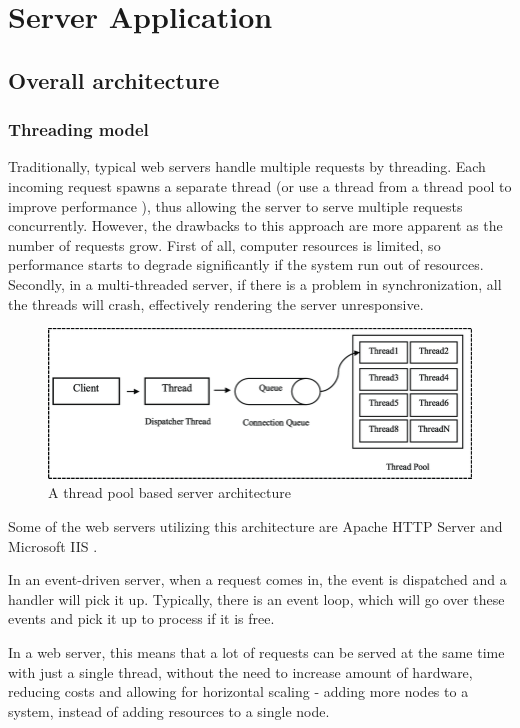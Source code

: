 \section{Server Application}
\subsection{Overall architecture}
\subsubsection{Threading model}
Traditionally, typical web servers handle multiple requests by threading. Each incoming request spawns a separate thread (or use a thread from a thread pool to improve performance \cite{thread_pool}), thus allowing the server to serve multiple requests concurrently. However, the drawbacks to this approach are more apparent as the number of requests grow. First of all, computer resources is limited, so performance starts to degrade significantly if the system run out of resources. Secondly, in a multi-threaded server, if there is a problem in synchronization, all the threads will crash, effectively rendering the server unresponsive.

\begin{figure}[!h]
	\centering
	\includegraphics[scale=0.4]{Picture/server/multithreaded-server-architecture.png}
	\caption{A thread pool based server architecture}
\label{fig:multithreaded-server}
\end{figure}

Some of the web servers utilizing this architecture are Apache HTTP Server \cite{apache} and Microsoft IIS \cite{iis}.

In an event-driven server, when a request comes in, the event is dispatched and a handler will pick it up. Typically, there is an event loop, which will go over these events and pick it up to process if it is free.

In a web server, this means that a lot of requests can be served at the same time with just a single thread, without the need to increase amount of hardware, reducing costs and allowing for horizontal scaling \cite{horizontal_scaling} - adding more nodes to a system, instead of adding resources to a single node.

